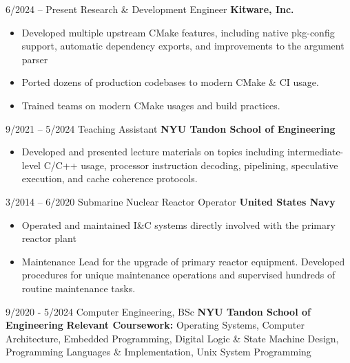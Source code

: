\documentclass[9pt]{developercv} %
\begin{document}
\vspace{-10 pt}
\begin{entrylist}
	\entry
	{6/2024 -- Present}
	{Research \& Development Engineer}
	{\textbf{Kitware, Inc.}}
	{\vspace{-10pt}
		\begin{itemize}[noitemsep,topsep=0pt,parsep=0pt,partopsep=0pt, leftmargin=-1pt]
			\item Developed multiple upstream CMake features, including native
						pkg-config support, automatic dependency exports, and improvements
						to the argument parser
			\item Ported dozens of production codebases to modern CMake \& CI usage.
			\item Trained teams on modern CMake usages and build practices.
		\end{itemize}
	}
	\entry
	{9/2021 -- 5/2024}
	{Teaching Assistant}
	{\textbf{NYU Tandon School of Engineering}}
	{\vspace{-10pt}
		\begin{itemize}[noitemsep,topsep=0pt,parsep=0pt,partopsep=0pt, leftmargin=-1pt]
			\item Developed and presented lecture materials on topics including
			      intermediate-level C/C++ usage, processor instruction decoding,
			      pipelining, speculative execution, and cache coherence protocols.
		\end{itemize}
	}
	\entry
	{3/2014 -- 6/2020}
	{Submarine Nuclear Reactor Operator}
	{\textbf{United States Navy}}
	{\vspace{-10pt}
		\begin{itemize}[noitemsep,topsep=0pt,parsep=0pt,partopsep=0pt, leftmargin=-1pt]
			\item Operated and maintained I\&C systems directly involved with the
			      primary reactor plant
			\item Maintenance Lead for the upgrade of primary reactor equipment.
			      Developed procedures for unique maintenance operations and
						supervised hundreds of routine maintenance tasks.

		\end{itemize}
	}
\end{entrylist}

\vspace{-10 pt}
\begin{entrylist}
	\entry
	{9/2020 - 5/2024}
	{Computer Engineering, BSc}
	{\textbf{NYU Tandon School of Engineering}}
	{
		\textbf{Relevant Coursework:} Operating Systems,
		Computer Architecture, Embedded Programming,
		Digital Logic \& State Machine Design,
		Programming Languages \& Implementation, Unix System Programming
	}
\end{entrylist}
\end{document}
